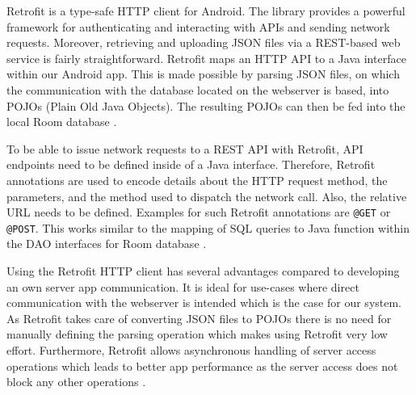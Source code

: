 Retrofit is a type-safe HTTP client for Android. The library provides a powerful framework for authenticating and interacting with APIs and sending network requests. Moreover, retrieving and uploading JSON files via a REST-based web service is fairly straightforward. Retrofit maps an HTTP API to a Java interface within our Android app. This is made possible by parsing JSON files, on which the communication with the database located on the webserver is based, into POJOs (Plain Old Java Objects). The resulting POJOs can then be fed into the local Room database \cite{retrofit1, retrofit2}.

To be able to issue network requests to a REST API with Retrofit, API endpoints need to be defined inside of a Java interface. Therefore, Retrofit annotations are used to encode details about the HTTP request method, the parameters, and the method used to dispatch the network call. Also, the relative URL needs to be defined. Examples for such Retrofit annotations are \texttt{@GET} or \texttt{@POST}. This works similar to the mapping of SQL queries to Java function within the DAO interfaces for Room database \cite{retrofit1}. 

Using the Retrofit HTTP client has several advantages compared to developing an own server app communication. It is ideal for use-cases where direct communication with the webserver is intended which is the case for our system. As Retrofit takes care of converting JSON files to POJOs there is no need for manually defining the parsing operation which makes using Retrofit very low effort. Furthermore, Retrofit allows asynchronous handling of server access operations which leads to better app performance as the server access does not block any other operations \cite{retrofit2}.

